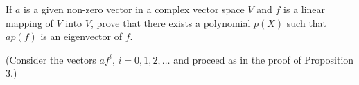 If $a$ is a given non-zero vector in a complex vector space $V$ and $f$ is a linear mapping of $V$ into $V$, prove that there exists a polynomial $p(X)$ such that $ap(f)$ is an eigenvector of $f$.

(Consider the vectors $af^i$, $i = 0, 1, 2, \ldots$ and proceed as in the proof of Proposition 3.)
